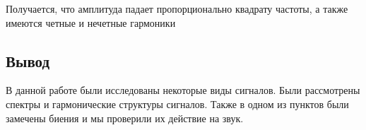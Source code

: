 Получается, что амплитуда падает пропорционально квадрату частоты, а также имеются четные и нечетные гармоники


\subsection{Вывод}

В данной работе были исследованы некоторые виды сигналов. Были рассмотрены спектры и гармонические структуры сигналов. Также в одном из пунктов были замечены биения и мы проверили их действие на звук.